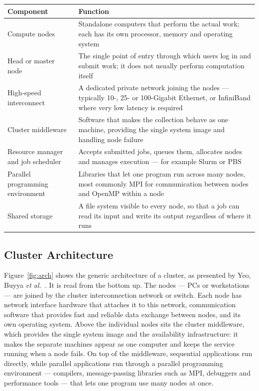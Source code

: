 \documentclass[../main.tex]{subfiles}
\begin{document}
\begin{center}
\begin{tabularx}{\textwidth}{@{}p{4.2cm}L@{}}
\toprule
\textbf{Component} & \textbf{Function} \\
\midrule
Compute nodes & Standalone computers that perform the actual work; each has
  its own processor, memory and operating system \\
Head or master node & The single point of entry through which users log in
  and submit work; it does not usually perform computation itself \\
High-speed interconnect & A dedicated private network joining the nodes ---
  typically 10-, 25- or 100-Gigabit Ethernet, or InfiniBand where very low
  latency is required \\
Cluster middleware & Software that makes the collection behave as one
  machine, providing the single system image and handling node failure \\
Resource manager and job scheduler & Accepts submitted jobs, queues them,
  allocates nodes and manages execution --- for example Slurm or PBS \\
Parallel programming environment & Libraries that let one program run across
  many nodes, most commonly MPI for communication between nodes and OpenMP
  within a node \\
Shared storage & A file system visible to every node, so that a job can read
  its input and write its output regardless of where it runs \\
\bottomrule
\end{tabularx}
\end{center}

\subsection{Cluster Architecture}

Figure~\ref{fig:arch} shows the generic architecture of a cluster, as
presented by Yeo, Buyya \emph{et al.}~. It is read from the
bottom up. The
nodes --- PCs or workstations --- are joined by the cluster interconnection
network or switch. Each node has network interface hardware that attaches it
to this network, communication software that provides fast and reliable data
exchange between nodes, and its own operating system. Above the individual
nodes sits the cluster middleware, which provides the single system image and
the availability infrastructure: it makes the separate machines appear as one
computer and keeps the service running when a node fails. On top of the
middleware, sequential applications run directly, while parallel applications
run through a parallel programming environment --- compilers, message-passing
libraries such as MPI, debuggers and performance tools --- that lets one
program use many nodes at once.
\end{document}

